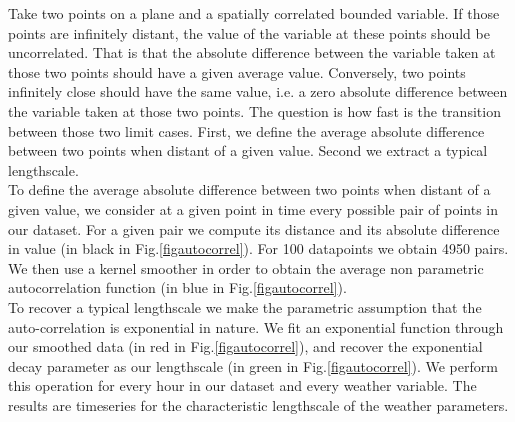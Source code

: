 Take two points on a plane and a spatially correlated bounded variable. If those points are infinitely distant, the value of the variable at these points should be uncorrelated. That is that the absolute difference between the variable taken at those two points should have a given average value. Conversely, two points infinitely close should have the same value, i.e. a zero absolute difference between the variable taken at those two points. The question is how fast is the transition between those two limit cases. First, we define the average absolute difference between two points when distant of a given value. Second we extract a typical lengthscale. \\

To define the average absolute difference between two points when distant of a given value, we consider at a given point in time every possible pair of points in our dataset. For a given pair we compute its distance and its absolute difference in value (in black in Fig.\ref{figautocorrel}). For 100 datapoints we obtain 4950 pairs. We then use a kernel smoother in order to obtain the average non parametric autocorrelation function (in blue in Fig.\ref{figautocorrel}). \\

To recover a typical lengthscale we make the parametric assumption that the auto-correlation is exponential in nature. We fit an exponential function through our smoothed data (in red in Fig.\ref{figautocorrel}), and recover the exponential decay parameter as our lengthscale (in green in Fig.\ref{figautocorrel}). We perform this operation for every hour in our dataset and every weather variable. The results are timeseries for the characteristic lengthscale of the weather parameters.


